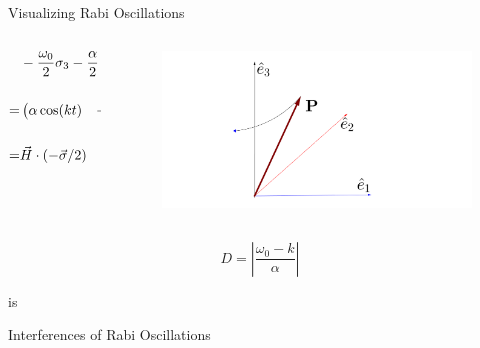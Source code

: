 \documentclass[9pt]{beamer}
\begin{document}
\begin{darkframes}
\begin{frame}{Visualizing Rabi Oscillations}
\begin{columns}[T]
\begin{column}{0.6\textwidth}

\begin{align*}
    &-\frac{\omega_0}{2} \sigma_3 - \frac{\alpha}{2} \cos(kt) \sigma_1 + \frac{\alpha}{2}\sin(kt) \sigma_2 \\
= & \begin{pmatrix}
\alpha \cos(kt) &
-\alpha \sin(kt) &
\omega_0
\end{pmatrix}
\colorbox{blue!50}{$\begin{pmatrix}
-\sigma_1/2 \\
-\sigma_2/2 \\
-\sigma_3/2
\end{pmatrix}
$} \\
=& \vec H \cdot (-\vec{\sigma}/2)
\end{align*}

\end{column}%
\begin{column}{0.4\textwidth}
\begin{figure}
    \centering
    \includegraphics[width=\textwidth,trim={2cm 0 3cm 0},clip]{assets/rabi-bloch-vector-rotation}
\end{figure}


\end{column}
\end{columns}


\begin{equation*}
    D = \left\vert\frac{\omega_0 - k}{\alpha} \right\vert
\end{equation*}

is

\end{frame}

\begin{frame}{Interferences of Rabi Oscillations}


\end{frame}
\end{darkframes}
\end{document}
